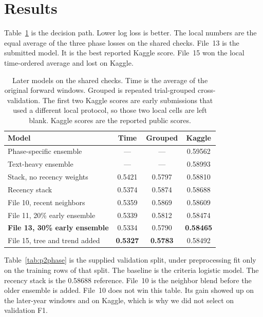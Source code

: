 \section{Results}
\label{sec:results}

Table~\ref{tab:p2scores} is the decision path. Lower log loss is better. The
local numbers are the equal average of the three phase losses on the shared
checks. File~13 is the submitted model. It is the best reported Kaggle score.
File~15 won the local time-ordered average and lost on Kaggle.

\begin{table}[t]
\centering\small
\setlength{\tabcolsep}{3pt}
\begin{tabular*}{\columnwidth}{@{\extracolsep{\fill}}lccc@{}}
\toprule
Model & Time & Grouped & Kaggle \\
\midrule
Phase-specific ensemble & --- & --- & 0.59562 \\
Text-heavy ensemble & --- & --- & 0.58993 \\
Stack, no recency weights & 0.5421 & 0.5797 & 0.58810 \\
Recency stack & 0.5374 & 0.5874 & 0.58688 \\
File 10, recent neighbors & 0.5359 & 0.5869 & 0.58609 \\
File 11, 20\% early ensemble & 0.5339 & 0.5812 & 0.58474 \\
\textbf{File 13, 30\% early ensemble} & 0.5334 & 0.5790 & \textbf{0.58465} \\
File 15, tree and trend added & \textbf{0.5327} & \textbf{0.5783} & 0.58492 \\
\bottomrule
\end{tabular*}
\caption{Later models on the shared checks. Time is the average of the
original forward windows. Grouped is repeated trial-grouped cross-validation.
The first two Kaggle scores are early submissions that used a different local
protocol, so those two local cells are left blank. Kaggle scores are the
reported public scores.}
\label{tab:p2scores}
\end{table}

Table~\ref{tab:p2phase} is the supplied validation split, under preprocessing
fit only on the training rows of that split. The baseline is the criteria
logistic model. The recency stack is the 0.58688 reference. File~10 is the
neighbor blend before the older ensemble is added. File~10 does not win this
table. Its gain showed up on the later-year windows and on Kaggle, which is
why we did not select on validation F1.

